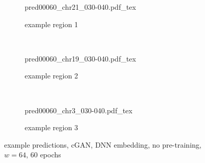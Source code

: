 \begin{figure}[p] %
    \begin{subfigure}{\textwidth}
        \centering
        \scriptsize
        {pred00060_chr21_030-040.pdf_tex}
        \caption{example  region 1} \label{fig:results:cGAN64-dnn_r1}
    \end{subfigure}\\[6mm]
    \begin{subfigure}{\textwidth}
        \centering
        \scriptsize
        {pred00060_chr19_030-040.pdf_tex}
        \caption{example region 2} \label{fig:results:cGAN64-dnn_r2}
    \end{subfigure}\\[6mm]
    \begin{subfigure}{\textwidth}
        \centering
        \scriptsize
        {pred00060_chr3_030-040.pdf_tex}
        \caption{example region 3} \label{fig:results:cGAN64-dnn_r3}
    \end{subfigure}
    \caption{example predictions, cGAN, DNN embedding, no pre-training, $w=64$, 60 epochs} \label{fig:results:cGAN64-dnn_matrices}
\end{figure}
